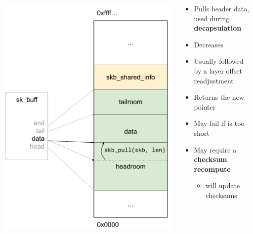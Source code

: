 \begin{frame}{}
	\begin{columns}
		\begin{column}{0.4\textwidth}
			\includegraphics[width=\textwidth]{slides/networking-skb/skb_pull.pdf}
		\end{column}
		\begin{column}{0.6\textwidth}
			\begin{itemize}
				\item Pulls header data, used during \textbf{decapsulation}
				\item Decreases 
				\item Usually followed by a layer offset readjustment
				\item Returns the new  pointer
				\item May fail if  is too short
				\item May require a \textbf{checksum recompute}
					\begin{itemize}
						\item {} will update checksums
					\end{itemize}
			\end{itemize}
		\end{column}
	\end{columns}
\end{frame}


